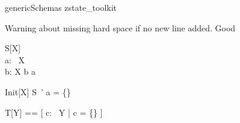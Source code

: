 
\begin{zsection}
   \SECTION genericSchemas \parents zstate\_toolkit
\end{zsection}

Warning about missing hard space if no new line added. Good
\begin{schema}{S}[X]
   \zstate \\
   a: \power~X \\
   b: X
\where
   b \in a
\end{schema}

\begin{schema}{Init}[X]
   S~'
\where
   a = \{\}
\end{schema}

\begin{zed}
   T[Y] == [ c: \power~Y | \lnot c = \{\} ]
\end{zed}
